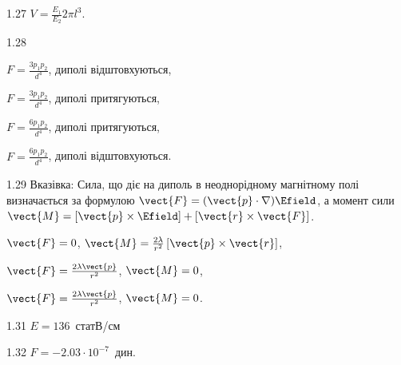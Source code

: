 \begin{Solution}{1.{27}}
	$V = \frac{E_1}{E_2}2\pi l^3$.
\end{Solution}
\begin{Solution}{1.{28}}
	\begin{enumerate*}[label=\alph*)]
		\item $F = \frac{3 p_1 p_2}{d^4}$, диполі відштовхуються,
		\item $F = \frac{3 p_1 p_2}{d^4}$, диполі притягуються,
		\item $F = \frac{6 p_1 p_2}{d^4}$, диполі притягуються,
		\item $F = \frac{6 p_1 p_2}{d^4}$, диполі відштовхуються.
	\end{enumerate*}
\end{Solution}
\begin{Solution}{1.{29}}
	Вказівка: Сила, що діє на диполь в неоднорідному магнітному полі визначається за формулою $\vect{F} = (\vect{p}\cdot\nabla)\Efield$, а момент сили $\vect{M} = \left[ \vect{p}\times\Efield\right]  + \left[ \vect{r}\times\vect{F}\right] $.

	\begin{enumerate*}[label=\alph*)]
		\item $\vect{F} = 0$, $\vect{M} = \frac{2\lambda}{r^2} \left[ \vect{p}\times\vect{r}\right] $,
		\item $\vect{F} = \frac{2\lambda \vect{p}}{r^2}$, $\vect{M} = 0$,
		\item $\vect{F} = \frac{2\lambda \vect{p}}{r^2}$, $\vect{M} = 0$.
	\end{enumerate*}
\end{Solution}
\begin{Solution}{1.{31}}
$E=136$~статВ/см
\end{Solution}
\begin{Solution}{1.{32}}
$F = −2.03 \cdot 10^{−7}$~дин.
\end{Solution}
